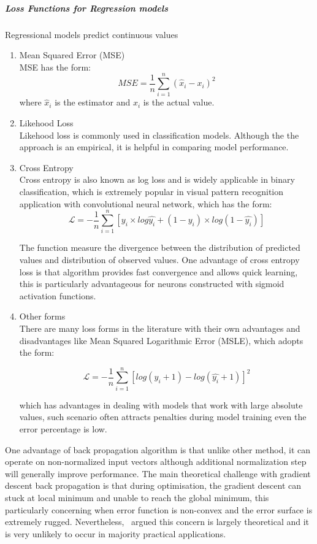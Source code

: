 \subparagraph {Loss Functions for Regression models}
Regressional models predict continuous values
\begin{enumerate}
    \item Mean Squared Error (MSE) \\
MSE has the form:
\begin{equation}
    MSE = \frac{1}{n}\sum_{i=1}^n (\hat{x}_i - x_i)^2
\end{equation}
where $\hat{x}_i$ is the estimator and $x_i$ is the actual value. 
    \item Likehood Loss \\
Likehood loss is commonly used in classification models. Although the the approach is an empirical, it is helpful in comparing model performance. 
    \item Cross Entropy \\
Cross entropy is also known as log loss and is widely applicable in binary classification, which is extremely popular in visual pattern recognition application with convolutional neural network, which has the form:
\begin{equation}
    \mathcal{L} = -\frac{1}{n}\sum_{i=1}^n [y_i \times log\hat{y_i} +(1-y_i) \times log(1-\hat{y_i}) ] 
\end{equation}

The function measure the divergence between the distribution of predicted values and distribution of observed values. One advantage of cross entropy loss is that algorithm provides fast convergence and allows quick learning, this is particularly advantageous for neurons constructed with sigmoid activation functions. 
    \item Other forms\\
There are many loss forms in the literature with their own advantages and disadvantages like Mean Squared Logarithmic Error (MSLE), which adopts the form:

\begin{equation}
    \mathcal{L} = -\frac{1}{n}\sum_{i=1}^n [log (y_i + 1) -  log(\hat{y_i} + 1) ]^2 
\end{equation}

which has advantages in dealing with models that work with large absolute values, such scenario often attracts penalties during model training even the error percentage is low. 
\end{enumerate}

\par 
One advantage of back propagation algorithm is that unlike other method, it can operate on non-normalized input vectors although additional normalization step will generally improve performance. \cite{Buckland:2002} The main theoretical challenge with gradient descent back propagation is that during optimisation, the gradient descent can stuck at local minimum and unable to reach the global minimum, this particularly concerning when error function is non-convex and the error surface is extremely rugged. Nevertheless,~\citet{LeCun_2015} argued this concern is largely theoretical and it is very unlikely to occur in majority practical applications. 